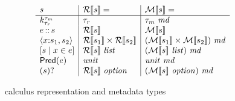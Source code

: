 \begin{figure}
\[
\begin{array}{l|l|l}
s & \repty{s} = & \mdty{s} =  \\
\hline
\Sk & \tau_r &  \tau_m~\mathit{md} \\
\SPath{e}{s} & \repty{s} & \mdty{s} \\
\SPair{x}{s_1}{s_2} & \repty{s_1} \times \repty{s_2} & \md{\mdty{s_1} \times \mdty{s_2}} \\
\SComp{s}{x}{e} & \repty{s}~\typ{list} & \md{\mdty{s}~\typ{list}}    \\
\SPred{e} & \typ{unit} & \typ{unit}~\mathit{md}\\
\SOption{s} & \repty{s}~\typ{option} & \md{\mdty{s}~\typ{option}} %
\end{array}
\]
\caption{\forest{} calculus representation and metadata types}
\label{fig:calculus-types}
\end{figure}


